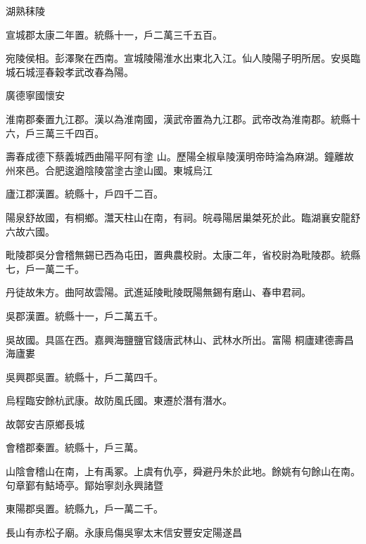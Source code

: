 \begin{pinyinscope}
 湖熟秣陵



 宣城郡太康二年置。統縣十一，戶二萬三千五百。



 宛陵侯相。彭澤聚在西南。宣城陵陽淮水出東北入江。仙人陵陽子明所居。安吳臨城石城涇春穀孝武改春為陽。



 廣德寧國懷安



 淮南郡秦置九江郡。漢以為淮南國，漢武帝置為九江郡。武帝改為淮南郡。統縣十六，戶三萬三千四百。



 壽春成德下蔡義城西曲陽平阿有塗
 山。歷陽全椒阜陵漢明帝時淪為麻湖。鐘離故州來邑。合肥逡遒陰陵當塗古塗山國。東城烏江



 廬江郡漢置。統縣十，戶四千二百。



 陽泉舒故國，有桐鄉。灊天柱山在南，有祠。皖尋陽居巢桀死於此。臨湖襄安龍舒六故六國。



 毗陵郡吳分會稽無錫已西為屯田，置典農校尉。太康二年，省校尉為毗陵郡。統縣七，戶一萬二千。



 丹徒故朱方。曲阿故雲陽。武進延陵毗陵既陽無錫有磨山、春申君祠。



 吳郡漢置。統縣十一，戶二萬五千。



 吳故國。具區在西。嘉興海鹽鹽官錢唐武林山、武林水所出。富陽
 桐廬建德壽昌海廬婁



 吳興郡吳置。統縣十，戶二萬四千。



 烏程臨安餘杭武康。故防風氏國。東遷於潛有潛水。



 故鄣安吉原鄉長城



 會稽郡秦置。統縣十，戶三萬。



 山陰會稽山在南，上有禹冢。上虞有仇亭，舜避丹朱於此地。餘姚有句餘山在南。句章鄞有鮚埼亭。鄮始寧剡永興諸暨



 東陽郡吳置。統縣九，戶一萬二千。



 長山有赤松子廟。永康烏傷吳寧太末信安豐安定陽遂昌




\end{pinyinscope}
